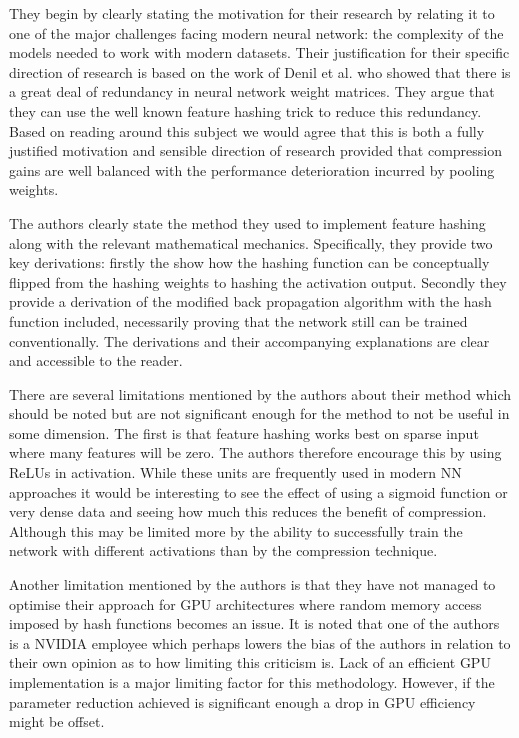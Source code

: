 \documentclass[journal]{IEEEtran}
\begin{document}
They begin by clearly stating the motivation for their research by relating it to one of the major challenges facing modern neural network: the complexity of the models needed to work with modern datasets. Their justification for their specific direction of research is based on the work of Denil et al. \cite{denil2013predicting} who showed that there is a great deal of redundancy in neural network weight matrices. They argue that they can use the well known feature hashing trick to reduce this redundancy. Based on reading around this subject we would agree that this is both a fully justified motivation and sensible direction of research provided that compression gains are well balanced with the performance deterioration incurred by pooling weights.

The authors clearly state the method they used to implement feature hashing along with the relevant mathematical mechanics. Specifically, they provide two key derivations: firstly the show how the hashing function can be conceptually flipped from the hashing weights to hashing the activation output. Secondly they provide a derivation of the modified back propagation algorithm with the hash function included, necessarily proving that the network still can be trained conventionally. The derivations and their accompanying explanations are clear and accessible to the reader.

There are several limitations mentioned by the authors about their method which should be noted but are not significant enough for the method to not be useful in some dimension. The first is that feature hashing works best on sparse input where many features will be zero. The authors therefore encourage this by using ReLUs in activation. While these units are frequently used in modern NN approaches it would be interesting to see the effect of using a sigmoid function or very dense data and seeing how much this reduces the benefit of compression. Although this may be limited more by the ability to successfully train the network with different activations than by the compression technique.

Another limitation mentioned by the authors is that they have not managed to optimise their approach for GPU architectures where random memory access imposed by hash functions becomes an issue. It is noted that one of the authors is a NVIDIA employee which perhaps lowers the bias of the authors in relation to their own opinion as to how limiting this criticism is. Lack of an efficient GPU implementation is a major limiting factor for this methodology. However, if the parameter reduction achieved is significant enough a drop in GPU efficiency might be offset.
\end{document}
